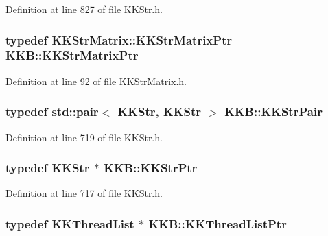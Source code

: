 Definition at line 827 of file K\+K\+Str.\+h.

\subsubsection[{\texorpdfstring{K\+K\+Str\+Matrix\+Ptr}{KKStrMatrixPtr}}]{\setlength{\rightskip}{0pt plus 5cm}typedef {\bf K\+K\+Str\+Matrix\+::\+K\+K\+Str\+Matrix\+Ptr} {\bf K\+K\+B\+::\+K\+K\+Str\+Matrix\+Ptr}}\hypertarget{namespace_k_k_b_a0645114c4d6ee02d11fa07d7d3407ee1}{}\label{namespace_k_k_b_a0645114c4d6ee02d11fa07d7d3407ee1}


Definition at line 92 of file K\+K\+Str\+Matrix.\+h.

\subsubsection[{\texorpdfstring{K\+K\+Str\+Pair}{KKStrPair}}]{\setlength{\rightskip}{0pt plus 5cm}typedef std\+::pair$<$ {\bf K\+K\+Str}, {\bf K\+K\+Str} $>$ {\bf K\+K\+B\+::\+K\+K\+Str\+Pair}}\hypertarget{namespace_k_k_b_a19bc771df76ae3c010ce487b355b02b5}{}\label{namespace_k_k_b_a19bc771df76ae3c010ce487b355b02b5}


Definition at line 719 of file K\+K\+Str.\+h.

\subsubsection[{\texorpdfstring{K\+K\+Str\+Ptr}{KKStrPtr}}]{\setlength{\rightskip}{0pt plus 5cm}typedef {\bf K\+K\+Str} $\ast$ {\bf K\+K\+B\+::\+K\+K\+Str\+Ptr}}\hypertarget{namespace_k_k_b_a9adbef5a6b3be0867f5570df2a08f388}{}\label{namespace_k_k_b_a9adbef5a6b3be0867f5570df2a08f388}


Definition at line 717 of file K\+K\+Str.\+h.

\subsubsection[{\texorpdfstring{K\+K\+Thread\+List\+Ptr}{KKThreadListPtr}}]{\setlength{\rightskip}{0pt plus 5cm}typedef {\bf K\+K\+Thread\+List} $\ast$ {\bf K\+K\+B\+::\+K\+K\+Thread\+List\+Ptr}}\hypertarget{namespace_k_k_b_a959019686fca1d3421262b937e82867a}{}\label{namespace_k_k_b_a959019686fca1d3421262b937e82867a}


